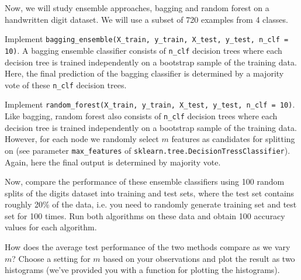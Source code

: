 \begin{problem}
Now, we will study ensemble approaches, bagging and random forest on a handwritten digit dataset. We will use a subset of 720 examples from 4 classes.

Implement \texttt{bagging\_ensemble(X\_train, y\_train, X\_test, y\_test, n\_clf = 10)}. A bagging ensemble classifier consists of \texttt{n\_clf} decision trees where each decision tree is trained independently on a bootstrap sample of the training data. Here, the final prediction of the bagging classifier is determined by a majority vote of these \texttt{n\_clf} decision trees.

Implement \texttt{random\_forest(X\_train, y\_train, X\_test, y\_test, n\_clf = 10)}. Like bagging, random forest also consists of \texttt{n\_clf} decision trees where each decision tree is trained independently on a bootstrap sample of the training data. However, for each node we randomly select $m$ features as candidates for splitting on (see parameter \texttt{max\_features} of \texttt{sklearn.tree.DecisionTressClassifier}). Again, here the final output is determined by majority vote. 

Now, compare the performance of these ensemble classifiers using 100 random splits of the digits dataset into training and test sets, where the test set contains roughly 20\% of the data, i.e. you need to randomly generate training set and test set for 100 times. Run both algorithms on these data and obtain 100 accuracy values for each algorithm. 

How does the average test performance of the two methods compare as we vary $m$? Choose a setting for $m$ based on your observations and plot the result as two histograms (we've provided you with a function for plotting the histograms).
\end{problem}
